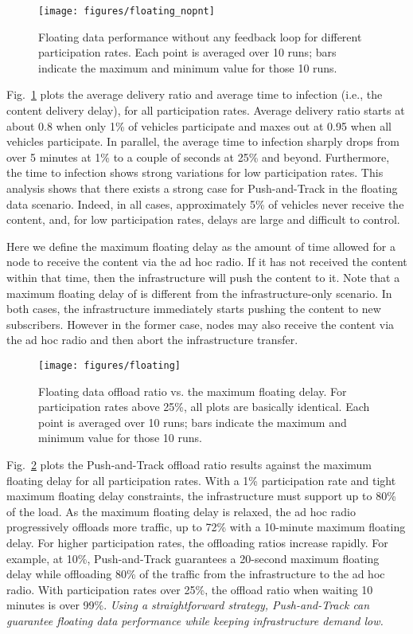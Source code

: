 \documentclass[preprint]{elsarticle}
\begin{document}
\begin{figure}[t]
  \centering
  \texttt{[image: figures/floating\_nopnt]}
  \caption{Floating data performance without any feedback loop for different participation rates. Each point is averaged over 10 runs; bars indicate the maximum and minimum value for those 10 runs.}
  \label{fig:floating_nopnt}
\end{figure}

Fig.~\ref{fig:floating_nopnt} plots the average delivery ratio and average time to infection (i.e., the content delivery delay), for all participation rates. Average delivery ratio starts at about 0.8 when only 1\% of vehicles participate and maxes out at 0.95 when all vehicles participate. In parallel, the average time to infection sharply drops from over 5 minutes at 1\% to a couple of seconds at 25\% and beyond. Furthermore, the time to infection shows strong variations for low participation rates. This analysis shows that there exists a strong case for Push-and-Track in the floating data scenario. Indeed, in all cases, approximately 5\% of vehicles never receive the content, and, for low participation rates, delays are large and difficult to control.

Here we define the maximum floating delay as the amount of time allowed for a node to receive the content via the ad hoc radio. If it has not received the content within that time, then the infrastructure will push the content to it. Note that a maximum floating delay of  is different from the infrastructure-only scenario. In both cases, the infrastructure immediately starts pushing the content to new subscribers. However in the former case, nodes may also receive the content via the ad hoc radio and then abort the infrastructure transfer.

\begin{figure}[t]
  \centering
  \texttt{[image: figures/floating]}
  \caption{Floating data offload ratio vs. the maximum floating delay. For participation rates above 25\%, all plots are basically identical. Each point is averaged over 10 runs; bars indicate the maximum and minimum value for those 10 runs.}
  \label{fig:floating}
\end{figure}

Fig.~\ref{fig:floating} plots the Push-and-Track offload ratio results against the maximum floating delay for all participation rates. With a 1\% participation rate and tight maximum floating delay constraints, the infrastructure must support up to 80\% of the load. As the maximum floating delay is relaxed, the ad hoc radio progressively offloads more traffic, up to 72\% with a 10-minute maximum floating delay. For higher participation rates, the offloading ratios increase rapidly. For example, at 10\%, Push-and-Track guarantees a 20-second maximum floating delay while offloading 80\% of the traffic from the infrastructure to the ad hoc radio. With participation rates over 25\%, the offload ratio when waiting 10 minutes is over 99\%. \emph{Using a straightforward strategy, Push-and-Track can guarantee floating data performance while keeping infrastructure demand low.}
\end{document}
